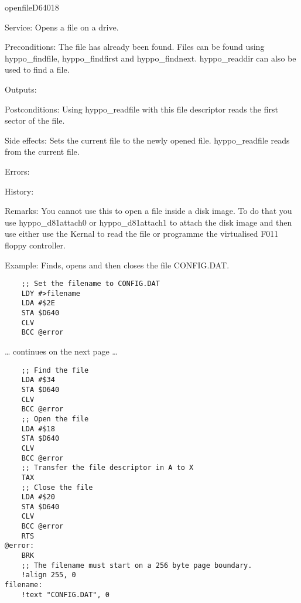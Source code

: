 \newpage
\begin{hyppotrap}{openfile}{D640}{18}
\item [Service:]
  Opens a file on a drive.
\item [Preconditions:]
  The file has already been found. Files can be found using hyppo\_findfile,
  hyppo\_findfirst and hyppo\_findnext. hyppo\_readdir can also be used to find a
  file.
\item [Outputs:]
\item [Postconditions:]
  Using hyppo\_readfile with this file descriptor reads the first sector of the
  file.
\item [Side effects:]
  Sets the current file to the newly opened file. hyppo\_readfile reads from the
  current file.
\item [Errors:]
\item [History:]
\item [Remarks:]
  You cannot use this to open a file inside a disk image. To do that you use
  hyppo\_d81attach0 or hyppo\_d81attach1 to attach the disk image and then use
  either use the Kernal to read the file or programme the virtualised F011 floppy
  controller.
\item [Example:]
  Finds, opens and then closes the file CONFIG.DAT.

\begin{tcolorbox}[colback=black,coltext=white]
\verbatimfont{\codefont}
\begin{verbatim}
    ;; Set the filename to CONFIG.DAT
    LDY #>filename
    LDA #$2E
    STA $D640
    CLV
    BCC @error
\end{verbatim}
\end{tcolorbox}

\ldots{} continues on the next page \ldots

\begin{tcolorbox}[colback=black,coltext=white]
\verbatimfont{\codefont}
\begin{verbatim}
    ;; Find the file
    LDA #$34
    STA $D640
    CLV
    BCC @error
    ;; Open the file
    LDA #$18
    STA $D640
    CLV
    BCC @error
    ;; Transfer the file descriptor in A to X
    TAX
    ;; Close the file
    LDA #$20
    STA $D640
    CLV
    BCC @error
    RTS
@error:
    BRK
    ;; The filename must start on a 256 byte page boundary.
    !align 255, 0
filename:
    !text "CONFIG.DAT", 0
\end{verbatim}
\end{tcolorbox}
\end{hyppotrap}


